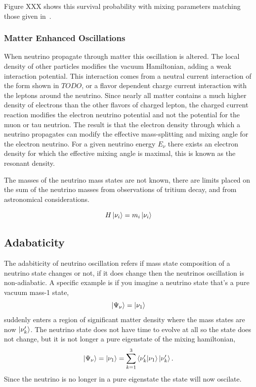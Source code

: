 Figure XXX shows this survival probability with mixing parameters matching those
given in~\cite{PDG2016}.


\subsubsection{Matter Enhanced Oscillations}
When neutrino propagate through matter this oscillation is altered.
The local density of other particles modifies the vacuum Hamiltonian,
adding a weak interaction potential.
This interaction comes from a neutral current interaction of the form
shown in $TODO$, or a flavor dependent charge current interaction with the
leptons around the neutrino.
Since nearly all matter contains a much higher density of electrons
than the other flavors of charged lepton, the charged current reaction
modifies the electron neutrino potential and not the potential for the muon
or tau neutrion.
The result is that the electron density through which a neutrino propagates
can modify the effective mass-splitting and mixing angle for the electron
neutrino.
For a given neutrino energy $E_{\nu}$ there exists an electron density for which
the effective mixing angle is maximal, this is known as the resonant density.

The masses of the neutrino mass states are not known, there are limits placed
on the sum of the neutrino masses from observations of tritium decay, and
from astronomical considerations. %


\begin{equation}
    H \ket{\nu_i} = m_i \ket{\nu_i}
\end{equation}

\subsection{Adabaticity}
The adabiticity of neutrino oscillation refers if mass state composition
of a neutrino state changes or not, if it does change then the neutrinos
oscillation is non-adiabatic.
A specific example is if you imagine a neutrino state that's a pure vacuum mass-1
state,
\begin{equation*}
    \ket{\Psi_{\nu}} = \ket{\nu_{1}}
\end{equation*}
suddenly enters a region of significant matter density where the mass states
are now $\ket{\nu_{k}^\prime}$.
The neutrino state does not have time to evolve at all so the state
does not change, but it is not longer a pure eigenstate of the mixing
hamiltonian,
\begin{equation*}
    \ket{\Psi_{\nu}} = \ket{\nu_{1}} = \sum_{k=1}^{3} \braket{\nu_{k}^\prime}{\nu_{1}}\ket{\nu_{k}^\prime}\text{.}
\end{equation*}
Since the neutrino is no longer in a pure eigenstate the state will
now oscilate.

